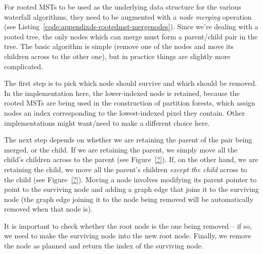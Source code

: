 For rooted MSTs to be used as the underlying data structure for the various waterfall algorithms, they need to be augmented with a \emph{node merging} operation (see Listing~\ref{code:appendixds-rootedmst-mergenodes}). Since we're dealing with a rooted tree, the only nodes which can merge must form a parent/child pair in the tree. The basic algorithm is simple (remove one of the nodes and move its children across to the other one), but in practice things are slightly more complicated.

The first step is to pick which node should survive and which should be removed. In the implementation here, the lower-indexed node is retained, because the rooted MSTs are being used in the construction of partition forests, which assign nodes an index corresponding to the lowest-indexed pixel they contain. Other implementations might want/need to make a different choice here.

The next step depends on whether we are retaining the parent of the pair being merged, or the child. If we are retaining the parent, we simply move all the child's children across to the parent (see Figure~\ref{?}). If, on the other hand, we are retaining the child, we move all the parent's children \emph{except the child} across to the child (see Figure~\ref{?}). Moving a node involves modifying its parent pointer to point to the surviving node and adding a graph edge that joins it to the surviving node (the graph edge joining it to the node being removed will be automatically removed when that node is).

It is important to check whether the root node is the one being removed -- if so, we need to make the surviving node into the new root node. Finally, we remove the node as planned and return the index of the surviving node.

